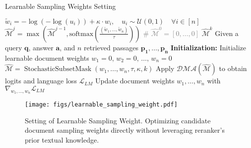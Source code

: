 \begin{center}
\begin{algorithm*}
\caption{Learnable Sampling Weights Setting}
\label{alg:masking_no_reranker}
\begin{algorithmic}[1]
        \State $\tilde{w}_i = -\log(-\log(u_i)) + \kappa \cdot w_i,\quad u_i \sim \mathcal{U}(0, 1) \quad \forall i \in [n]$
        \State $\hat{\mathcal{M}}^{j} = \max(\hat{\mathcal{M}}^{j-1}, \text{softmax}\left(\frac{(\tilde{w}_1, \dots, \tilde{w}_n)}{\tau}\right))$ \quad \textcolor{gray}{\# $\hat{\mathcal{M}}^{0} = [0, \dots, 0]$}
    \EndFor
    \State \Return $\hat{\mathcal{M}}^{k}$ 
\EndProcedure
\State
\State Given a query $\mathbf{q}$, answer $\mathbf{a}$, and $n$ retrieved passages $\mathbf{p_1}, \dots, \mathbf{p_n}$
\State \textbf{Initialization:} Initialize learnable document weights $w_1 = 0, \, w_2 = 0, \, \dots, \, w_n = 0$
    \State $\hat{\mathcal{M}} = \operatorname{StochasticSubsetMask}(w_1, \dots, w_n, \tau, \kappa, k)$
    \State Apply $\mathcal{DMA}(\hat{\mathcal{M}})$ to obtain logits and language loss $\mathcal{L}_{LM}$  
    \State Update document weights $w_1, \dots, w_n$ with $\nabla_{w_1, \dots, w_n} \mathcal{L}_{LM}$ 
\EndFor
\end{algorithmic}
\end{algorithm*}
\end{center}


\begin{figure*}[!th]
  \texttt{[image: figs/learnable\_sampling\_weight.pdf]}
  \centering
\caption{Setting of Learnable Sampling Weight. Optimizing candidate document sampling weights directly without leveraging reranker's prior textual knowledge.}
\label{fig:learnable_sampling_weight method}
\end{figure*}


